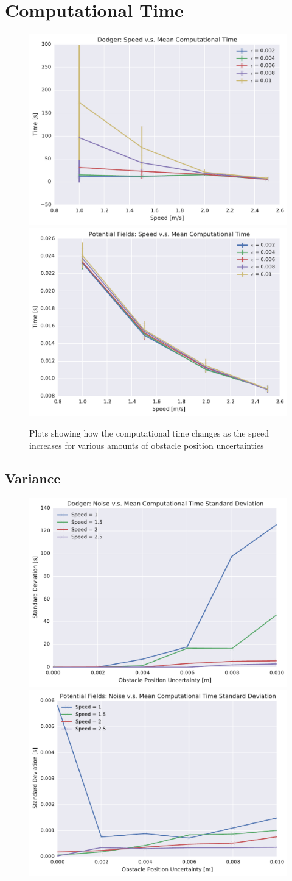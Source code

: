 \section{Computational Time}

\begin{figure}[h!]
    \centering
    \includegraphics[width=0.48\linewidth]{figs/planner_mean_times_0}
    \includegraphics[width=0.48\linewidth]{figs/pf_mean_times_0}
    \caption{Plots showing how the computational time changes as the speed
    increases for various amounts of obstacle position uncertainties}
    \label{fig:plot_comp_time}
\end{figure}

\subsection{Variance}

\begin{figure}[h!]
    \centering
    \includegraphics[width=0.48\linewidth]{figs/planner_std_avg_times_0}
    \includegraphics[width=0.48\linewidth]{figs/pf_std_avg_times_0}
    \caption{}
    \label{fig:plot_std_comp_time}
\end{figure}


